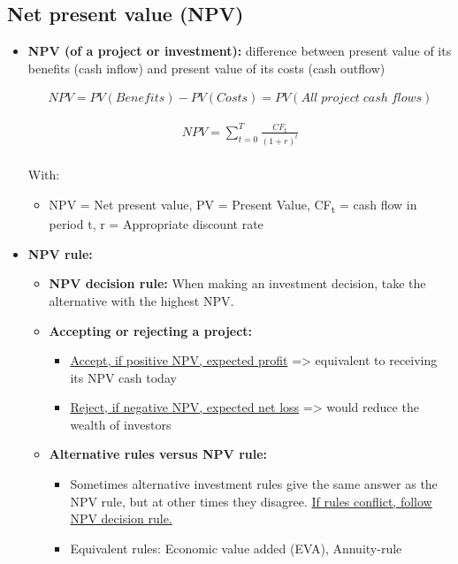 \documentclass[ieeetran]{article}
\begin{document}
\subsection{Net present value (NPV)} %
\label{ssub:net_present_value_nPV_}

\begin{itemize}
  \item \textbf{NPV (of a project or investment):} difference between present value of its benefits (cash inflow) and present value of its costs (cash outflow)

\large
\begin{equation*}
\boxed{
\begin{aligned}
NPV = PV(Benefits) - PV(Costs) =PV(All \; project \; cash \; flows)
\end{aligned}
}
\end{equation*}

\large
\begin{equation*}
\boxed{
\begin{aligned}
	NPV = \sum_{t=0}^{T} \frac{CF_t}{(1 + r)^t} 
\end{aligned}
}
\end{equation*}
\\
\normalsize
With:
\begin{itemize}
	\item NPV = Net present value, PV = Present Value, CF\textsubscript{t} = cash flow in period t, r = Appropriate discount rate
\end{itemize}

\item \textbf{NPV rule:}
	\begin{itemize}
	  \item \textbf{NPV decision rule:} When making an investment decision, take the alternative with the highest NPV.
     	  \item \textbf{Accepting or rejecting a project:}
		  \begin{itemize}
		    \item \underline{Accept, if positive NPV, expected profit} => equivalent to receiving its NPV cash today
		    \item \underline{Reject, if negative NPV, expected net loss} => would reduce the wealth of investors

		  \end{itemize}
	  \item \textbf{Alternative rules versus NPV rule:}
		  \begin{itemize}
		    \item Sometimes alternative investment rules give the same answer as the NPV rule, but at other times they disagree. \underline{If rules conflict, follow NPV decision rule.}
		    \item Equivalent rules: Economic value added (EVA), Annuity-rule
		  \end{itemize}
	\end{itemize}
\end{itemize}
\end{document}
